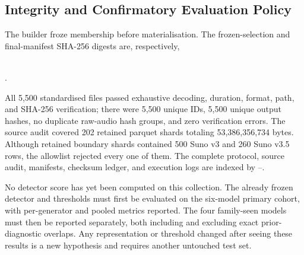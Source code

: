 \subsection{Integrity and Confirmatory Evaluation Policy}

The builder froze membership before materialisation. The frozen-selection and
final-manifest SHA-256 digests are, respectively,
\begin{center}
\small
{}\\
.
\end{center}

All 5,500 standardised files passed exhaustive decoding, duration, format,
path, and SHA-256 verification; there were 5,500 unique IDs, 5,500 unique output
hashes, no duplicate raw-audio hash groups, and zero verification errors. The
source audit  covered 202 retained parquet shards totaling
53,386,356,734 bytes. Although retained boundary shards contained 500 Suno v3
and 260 Suno v3.5 rows, the allowlist rejected every one of them. The complete
protocol, source audit, manifests, checksum ledger, and execution logs are
indexed by --.

No detector score has yet been computed on this collection. The already frozen
detector and thresholds must first be evaluated on the six-model primary cohort,
with per-generator and pooled metrics reported. The four family-seen models must
then be reported separately, both including and excluding exact prior-diagnostic
overlaps. Any representation or threshold changed after seeing these results is
a new hypothesis and requires another untouched test set.


